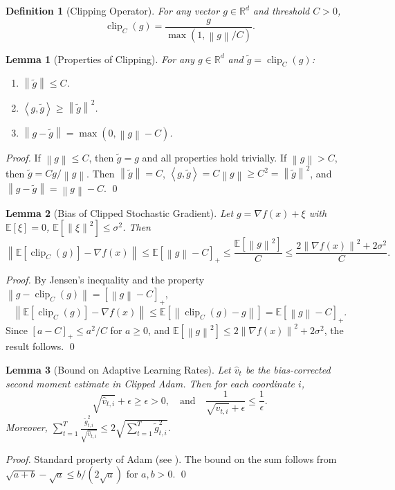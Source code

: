 \documentclass{article}
\newtheorem{lemma}{Lemma}
\newtheorem{definition}{Definition}
\newcommand{\R}{\mathbb{R}}
\newcommand{\E}{\mathbb{E}}
\newcommand{\norm}[1]{\left\| #1 \right\|}
\newcommand{\inner}[2]{\left\langle #1, #2 \right\rangle}
\newcommand{\clip}[2]{\operatorname{clip}_{#1}(#2)}
\begin{document}
\begin{definition}[Clipping Operator]
    For any vector $g \in \R^d$ and threshold $C > 0$,
    \[
        \clip{C}{g} = \frac{g}{\max(1, \norm{g}/C)}.
    \]
\end{definition}

\begin{lemma}[Properties of Clipping] \label{lem:clip}
    For any $g \in \R^d$ and $\tilde{g} = \clip{C}{g}$:
    \begin{enumerate}
        \item $\norm{\tilde{g}} \le C$.
        \item $\inner{g}{\tilde{g}} \ge \norm{\tilde{g}}^2$.
        \item $\norm{g - \tilde{g}} = \max(0, \norm{g} - C)$.
    \end{enumerate}
\end{lemma}
\begin{proof}
    If $\norm{g} \le C$, then $\tilde{g}=g$ and all properties hold trivially. If $\norm{g} > C$, then $\tilde{g} = C g / \norm{g}$. Then $\norm{\tilde{g}} = C$, $\inner{g}{\tilde{g}} = C \norm{g} \ge C^2 = \norm{\tilde{g}}^2$, and $\norm{g-\tilde{g}} = \norm{g} - C$. \qed
\end{proof}

\begin{lemma}[Bias of Clipped Stochastic Gradient] \label{lem:clip_bias}
    Let $g = \nabla f(x) + \xi$ with $\E[\xi]=0$, $\E[\norm{\xi}^2] \le \sigma^2$. Then
    \[
        \norm{\E[\clip{C}{g}] - \nabla f(x)} \le \E[\norm{g} - C]_+ \le \frac{\E[\norm{g}^2]}{C} \le \frac{2\norm{\nabla f(x)}^2 + 2\sigma^2}{C}.
    \]
\end{lemma}
\begin{proof}
    By Jensen's inequality and the property $\norm{g - \clip{C}{g}} = [\norm{g}-C]_+$,
    \[
        \norm{\E[\clip{C}{g}] - \nabla f(x)} \le \E[\norm{\clip{C}{g} - g}] = \E[\norm{g}-C]_+.
    \]
    Since $[a-C]_+ \le a^2/C$ for $a \ge 0$, and $\E[\norm{g}^2] \le 2\norm{\nabla f(x)}^2 + 2\sigma^2$, the result follows. \qed
\end{proof}

\begin{lemma}[Bound on Adaptive Learning Rates] \label{lem:adaptive_bound}
    Let $\hat{v}_t$ be the bias-corrected second moment estimate in Clipped Adam. Then for each coordinate $i$,
    \[
        \sqrt{\hat{v}_{t,i}} + \epsilon \ge \epsilon > 0, \quad \text{and} \quad \frac{1}{\sqrt{\hat{v}_{t,i}} + \epsilon} \le \frac{1}{\epsilon}.
    \]
    Moreover, $\sum_{t=1}^T \frac{\tilde{g}_{t,i}^2}{\sqrt{\hat{v}_{t,i}}} \le 2 \sqrt{\sum_{t=1}^T \tilde{g}_{t,i}^2}$.
\end{lemma}
\begin{proof}
    Standard property of Adam (see \cite{kingma2014adam}). The bound on the sum follows from $\sqrt{a+b} - \sqrt{a} \le b/(2\sqrt{a})$ for $a,b>0$. \qed
\end{proof}
\end{document}
